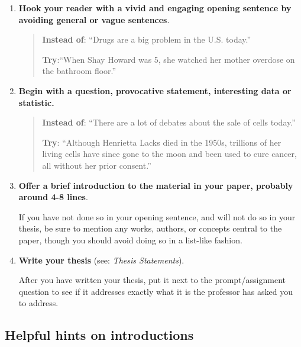 \begin{enumerate}
\item \textbf{Hook your reader with a vivid and engaging opening sentence by avoiding general or vague sentences}.
        	               	        	
\begin{quote}

\textbf{Instead of}: ``Drugs are a big problem in the U.S. today.''

\textbf{Try}:``When Shay Howard was 5, she watched her mother
overdose on  the bathroom floor.''
\end{quote}
        	    	
\item {\textbf{Begin with a question, provocative statement, interesting data or statistic.}}

\begin{quote}
                            	                   
\textbf{Instead of}: ``There are a lot of debates about the sale of cells today.''

\textbf{Try}: ``Although Henrietta Lacks died in the 1950s, trillions
      of her living cells have since gone to the moon and  
      been used to cure cancer, all without her prior
      consent.''     
\end{quote}
                    	 
\item \textbf{Offer a brief introduction to the material in your paper, probably around 4-8 lines}. 

If you have not done so in your opening sentence, and will not do so in your thesis, be sure to mention any works, authors, or concepts central to the paper, though you should avoid doing so in a list-like fashion.
 
\item \textbf{Write your thesis} (see: \emph{Thesis Statements}).

After you have written your thesis, put it next to the prompt/assignment question to see if it addresses exactly what it is the professor has asked you to address.  
  
 \end{enumerate}

 
\subsection{Helpful hints on introductions}

